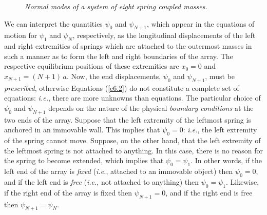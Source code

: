 \begin{figure}
\epsfysize=7in
\centerline{}
\caption{\em Normal modes of a system of eight spring coupled masses.}\label{f6.2}   
\end{figure}

We can interpret the quantities $\psi_0$ and $\psi_{N+1}$, which appear
in the equations of motion for $\psi_1$ and $\psi_N$,  respectively, as the longitudinal displacements of
the left and right  extremities of  springs which are attached to the outermost masses in such a manner as to form the left and right boundaries of the array.
The respective equilibrium positions of these  extremities are $x_0=0$ and $x_{N+1}=(N+1)\,a$. 
Now, the end displacements, $\psi_0$ and $\psi_{N+1}$, must be {\em prescribed}, otherwise Equations (\ref{e6.2})
do not constitute a complete set of equations: {\em i.e.}, there are more  unknowns  than equations.  
The particular choice of $\psi_0$ and $\psi_{N+1}$ depends on the nature of the physical
{\em boundary conditions}\/ at the two ends of the array. Suppose that the
left extremity of the leftmost spring  is anchored in an
immovable wall. This implies that $\psi_0=0$: {\em i.e.}, the left extremity of the
spring cannot move. Suppose, on the other hand, that the left extremity of the leftmost spring  is not attached to anything. In this case, there is no reason for the spring
to become extended, which implies  that $\psi_0=\psi_1$. In other words, if the left
end of the array is {\em fixed}\/ ({\em i.e.}, attached to an immovable object) then $\psi_0=0$, and if the left end is
{\em free}\/  ({\em i.e.}, not attached to anything) then $\psi_0=\psi_1$. Likewise, if the right end of the array
is fixed then $\psi_{N+1}=0$, and if the right  end is free then
$\psi_{N+1}=\psi_N$. 

